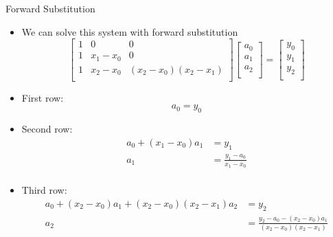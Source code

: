 \documentclass[10pt]{beamer}
\begin{document}

\begin{frame}{Forward Substitution}
\begin{itemize}
    \item We can solve this system with forward substitution 
    \begin{equation*}
  \begin{bmatrix}
    1 & 0 & 0\\
    1 & x_1 - x_0 & 0\\
    1 & x_2 - x_0 & (x_2-x_0)(x_2-x_1)\\
  \end{bmatrix}
  \begin{bmatrix}
    a_0\\ a_1\\ a_2\\
  \end{bmatrix} =
  \begin{bmatrix}
    y_0\\ y_1\\ y_2\\
  \end{bmatrix}
\end{equation*}

\item First row:
    $$
    a_0 = y_0
    $$
\item Second row: 
\begin{align*}    
a_0 + (x_1-x_0) a_1 &= y_1\\ 
 a_1 &= \frac{y_1-a_0}{x_1-x_0}\\ 
\end{align*}
\item Third row:
\begin{align*}    
a_0 + (x_2-x_0) a_1 + (x_2-x_0)(x_2-x_1)a_2&= y_2\\ 
 a_2 &= \frac{y_2-a_0 - (x_2-x_0) a_1}{(x_2-x_0)(x_2-x_1)}\\ 
\end{align*}
\end{itemize}
\end{frame}
\end{document}
